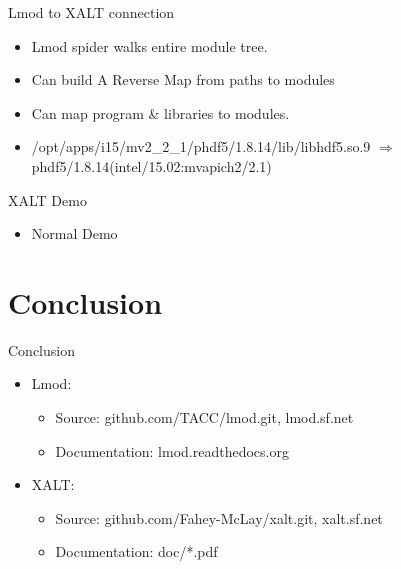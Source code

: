 \documentclass{beamer}
\begin{document}
\begin{frame}{Lmod to XALT connection}
  \begin{itemize}
    \item Lmod spider walks entire module tree.
    \item Can build A Reverse Map from paths to modules
    \item Can map program \& libraries to modules.
    \item /opt/apps/i15/mv2\_2\_1/phdf5/1.8.14/lib/libhdf5.so.9
      $\Rightarrow$ phdf5/1.8.14(intel/15.02:mvapich2/2.1)
  \end{itemize}
\end{frame}

\begin{frame}{XALT Demo}
  \begin{itemize}
    \item Normal Demo
  \end{itemize}
\end{frame}


\section{Conclusion}
\begin{frame}{Conclusion}
  \begin{itemize}
    \item Lmod:
      \begin{itemize}
        \item Source: github.com/TACC/lmod.git, lmod.sf.net
        \item Documentation: lmod.readthedocs.org
      \end{itemize}
    \item XALT:
      \begin{itemize}
        \item Source: github.com/Fahey-McLay/xalt.git, xalt.sf.net
        \item Documentation: doc/*.pdf
      \end{itemize}
  \end{itemize}
\end{frame}
\end{document}
